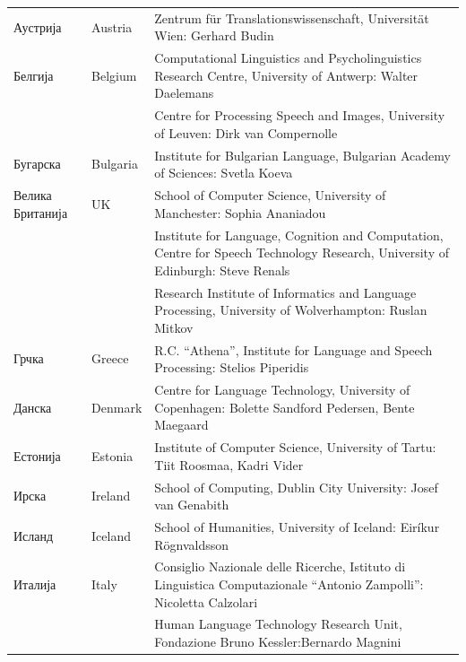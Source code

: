 {\small
\begin{longtable}{llp{114mm}}
  Аустрија & \textcolor{grey1}{Austria} & Zentrum für Translationswissenschaft, Universität Wien: Gerhard Budin\\ \addlinespace 
  Белгија & \textcolor{grey1}{Belgium} & Computational Linguistics and Psycholinguistics Research Centre, University of Antwerp: Walter Daelemans\\ \addlinespace
  & & Centre for Processing Speech and Images, University of Leuven: Dirk van Compernolle \\ \addlinespace
  Бугарска & \textcolor{grey1}{Bulgaria} & Institute for Bulgarian Language, Bulgarian Academy of Sciences: Svetla Koeva \\ \addlinespace
  Велика Британија & \textcolor{grey1}{UK} & 
  School of Computer Science, University of Manchester: Sophia Ananiadou \\ \addlinespace 
  & & Institute for Language, Cognition and Computation, Centre for Speech Technology Research, University of Edinburgh: Steve Renals \\ \addlinespace 
  & & Research Institute of Informatics and Language Processing, University of Wolverhampton: Ruslan Mitkov \\ \addlinespace 
  Грчка & \textcolor{grey1}{Greece} & R.C. “Athena”, Institute for Language and Speech Processing: Stelios Piperidis\\ \addlinespace  
  Данска &  \textcolor{grey1}{Denmark} & Centre for Language Technology, University of Copenhagen: \newline Bolette Sandford Pedersen, Bente Maegaard\\ \addlinespace
  Естонија & \textcolor{grey1}{Estonia} & Institute of Computer Science, University of Tartu: Tiit Roosmaa, Kadri Vider\\ \addlinespace
  Ирска & \textcolor{grey1}{Ireland} & School of Computing, Dublin City University: Josef van Genabith\\\addlinespace
  Исланд &  \textcolor{grey1}{Iceland} & School of Humanities, University of Iceland: Eiríkur Rögnvaldsson\\\addlinespace
  Италија & \textcolor{grey1}{Italy} & Consiglio Nazionale delle Ricerche, Istituto di Linguistica Computazionale “Antonio Zampolli”: Nicoletta Calzolari\\ \addlinespace
  & & Human Language Technology Research Unit, Fondazione Bruno Kessler:\newline Bernardo Magnini\\

\end{longtable}}
